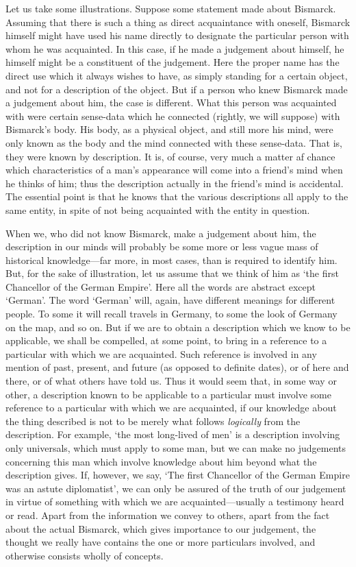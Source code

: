 \documentclass[oneside,letterpaper,12pt]{book}
\begin{document}
Let us take some illustrations. Suppose some statement made about
Bismarck. Assuming that there is such a thing as direct acquaintance
with oneself, Bismarck himself might have used his name directly to
designate the particular person with whom he was acquainted. In this
case, if he made a judgement about himself, he himself might be a
constituent of the judgement. Here the proper name has the direct use
which it always wishes to have, as simply standing for a certain object,
and not for a description of the object. But if a person who knew
Bismarck made a judgement about him, the case is different. What this
person was acquainted with were certain sense-data which he connected
(rightly, we will suppose) with Bismarck's body. His
body, as a physical object, and still more his mind, were only known as
the body and the mind connected with these sense-data. That is, they
were known by description. It is, of course, very much a matter af
chance which characteristics of a man's appearance will
come into a friend's mind when he thinks of him; thus
the description actually in the friend's mind is
accidental. The essential point is that he knows that the various
descriptions all apply to the same entity, in spite of not being
acquainted with the entity in question.

When we, who did not know Bismarck, make a judgement about him, the
description in our minds will probably be some more or less vague mass
of historical knowledge---far more, in most cases, than is required to
identify him. But, for the sake of illustration, let us assume that we
think of him as `the first Chancellor of the German
Empire'. Here all the words are abstract except
`German'. The word
`German' will, again, have different
meanings for different people. To some it will recall travels in
Germany, to some the look of Germany on the map, and so on. But if we
are to obtain a description which we know to be applicable, we shall be
compelled, at some point, to bring in a reference to a particular with
which we are acquainted. Such reference is involved in any mention of
past, present, and future (as opposed to definite dates), or of here and
there, or of what others have told us. Thus it would seem that, in some
way or other, a description known to be applicable to a particular must
involve some reference to a particular with which we are acquainted, if
our knowledge about the thing described is not to be merely what follows
\emph{logically} from the description. For example, `the
most long-lived of men' is a description involving only
universals, which must apply to some man, but we can make no judgements
concerning this man which involve knowledge about him beyond what the
description gives. If, however, we say, `The first
Chancellor of the German Empire was an astute
diplomatist', we can only be assured of the truth of our
judgement in virtue of something with which we are acquainted---usually
a testimony heard or read. Apart from the information we convey to
others, apart from the fact about the actual Bismarck, which gives
importance to our judgement, the thought we really have contains the one
or more particulars involved, and otherwise consists wholly of concepts.
\end{document}
